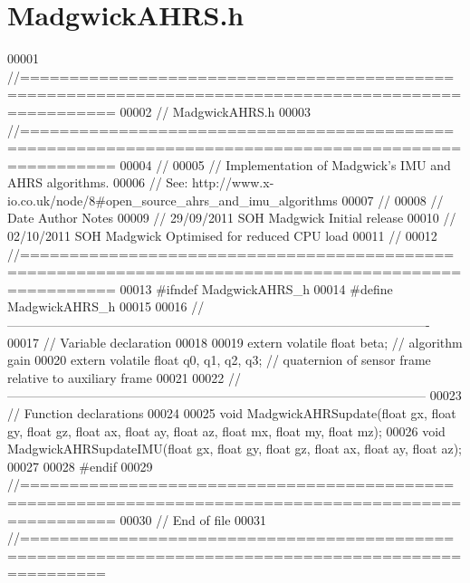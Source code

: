 \hypertarget{_madgwick_a_h_r_s_8h_source}{}\section{Madgwick\+A\+H\+R\+S.\+h}
\label{_madgwick_a_h_r_s_8h_source}

\begin{DoxyCode}
00001 \textcolor{comment}{//=====================================================================================================}
00002 \textcolor{comment}{// MadgwickAHRS.h}
00003 \textcolor{comment}{//=====================================================================================================}
00004 \textcolor{comment}{//}
00005 \textcolor{comment}{// Implementation of Madgwick's IMU and AHRS algorithms.}
00006 \textcolor{comment}{// See: http://www.x-io.co.uk/node/8#open\_source\_ahrs\_and\_imu\_algorithms}
00007 \textcolor{comment}{//}
00008 \textcolor{comment}{// Date         Author          Notes}
00009 \textcolor{comment}{// 29/09/2011   SOH Madgwick    Initial release}
00010 \textcolor{comment}{// 02/10/2011   SOH Madgwick    Optimised for reduced CPU load}
00011 \textcolor{comment}{//}
00012 \textcolor{comment}{//=====================================================================================================}
00013 \textcolor{preprocessor}{#ifndef MadgwickAHRS\_h}
00014 \textcolor{preprocessor}{#define MadgwickAHRS\_h}
00015 
00016 \textcolor{comment}{//----------------------------------------------------------------------------------------------------}
00017 \textcolor{comment}{// Variable declaration}
00018 
00019 \textcolor{keyword}{extern} \textcolor{keyword}{volatile} \textcolor{keywordtype}{float} beta;             \textcolor{comment}{// algorithm gain}
00020 \textcolor{keyword}{extern} \textcolor{keyword}{volatile} \textcolor{keywordtype}{float} q0, q1, q2, q3;   \textcolor{comment}{// quaternion of sensor frame relative to auxiliary frame}
00021 
00022 \textcolor{comment}{//---------------------------------------------------------------------------------------------------}
00023 \textcolor{comment}{// Function declarations}
00024 
00025 \textcolor{keywordtype}{void} MadgwickAHRSupdate(\textcolor{keywordtype}{float} gx, \textcolor{keywordtype}{float} gy, \textcolor{keywordtype}{float} gz, \textcolor{keywordtype}{float} ax, \textcolor{keywordtype}{float} ay, \textcolor{keywordtype}{float} az, \textcolor{keywordtype}{float} mx, \textcolor{keywordtype}{float} my, \textcolor{keywordtype}{
      float} mz);
00026 \textcolor{keywordtype}{void} MadgwickAHRSupdateIMU(\textcolor{keywordtype}{float} gx, \textcolor{keywordtype}{float} gy, \textcolor{keywordtype}{float} gz, \textcolor{keywordtype}{float} ax, \textcolor{keywordtype}{float} ay, \textcolor{keywordtype}{float} az);
00027 
00028 \textcolor{preprocessor}{#endif}
00029 \textcolor{comment}{//=====================================================================================================}
00030 \textcolor{comment}{// End of file}
00031 \textcolor{comment}{//====================================================================================================}
\end{DoxyCode}
